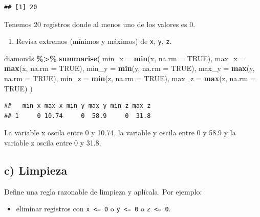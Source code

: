 \documentclass[
  spanish,
]{article}
\newenvironment{Shaded}{\begin{snugshade}}{\end{snugshade}}
\newcommand{\AttributeTok}[1]{\textcolor[rgb]{0.13,0.29,0.53}{#1}}
\newcommand{\ConstantTok}[1]{\textcolor[rgb]{0.56,0.35,0.01}{#1}}
\newcommand{\FunctionTok}[1]{\textcolor[rgb]{0.13,0.29,0.53}{\textbf{#1}}}
\newcommand{\NormalTok}[1]{#1}
\newcommand{\SpecialCharTok}[1]{\textcolor[rgb]{0.81,0.36,0.00}{\textbf{#1}}}
\providecommand{\tightlist}{%
  \setlength{\itemsep}{0pt}\setlength{\parskip}{0pt}}
\begin{document}
\begin{verbatim}
## [1] 20
\end{verbatim}

Tenemos 20 registros donde al menos uno de los valores es 0.

\begin{enumerate}
\def\labelenumi{\arabic{enumi}.}
\setcounter{enumi}{1}
\tightlist
\item
  Revisa extremos (mínimos y máximos) de \texttt{x}, \texttt{y},
  \texttt{z}.
\end{enumerate}

\begin{Shaded}
\begin{Highlighting}[]
\NormalTok{diamonds }\SpecialCharTok{\%\textgreater{}\%} \FunctionTok{summarise}\NormalTok{(}
  \AttributeTok{min\_x =} \FunctionTok{min}\NormalTok{(x, }\AttributeTok{na.rm =} \ConstantTok{TRUE}\NormalTok{), }\AttributeTok{max\_x =} \FunctionTok{max}\NormalTok{(x, }\AttributeTok{na.rm =} \ConstantTok{TRUE}\NormalTok{),}
  \AttributeTok{min\_y =} \FunctionTok{min}\NormalTok{(y, }\AttributeTok{na.rm =} \ConstantTok{TRUE}\NormalTok{), }\AttributeTok{max\_y =} \FunctionTok{max}\NormalTok{(y, }\AttributeTok{na.rm =} \ConstantTok{TRUE}\NormalTok{),}
  \AttributeTok{min\_z =} \FunctionTok{min}\NormalTok{(z, }\AttributeTok{na.rm =} \ConstantTok{TRUE}\NormalTok{), }\AttributeTok{max\_z =} \FunctionTok{max}\NormalTok{(z, }\AttributeTok{na.rm =} \ConstantTok{TRUE}\NormalTok{)}
\NormalTok{)}
\end{Highlighting}
\end{Shaded}

\begin{verbatim}
##   min_x max_x min_y max_y min_z max_z
## 1     0 10.74     0  58.9     0  31.8
\end{verbatim}

La variable x oscila entre 0 y 10.74, la variable y oscila entre 0 y
58.9 y la variable z oscila entre 0 y 31.8.

\subsection*{c) Limpieza}\label{c-limpieza}

Define una regla razonable de limpieza y aplícala. Por ejemplo:

\begin{itemize}
\tightlist
\item
  eliminar registros con \texttt{x\ \textless{}=\ 0} o
  \texttt{y\ \textless{}=\ 0} o \texttt{z\ \textless{}=\ 0}.
\end{itemize}
\end{document}
